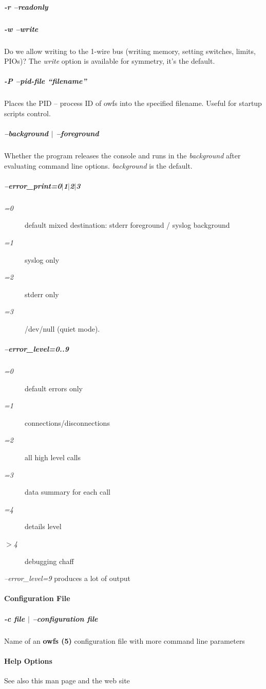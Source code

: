 \subparagraph*{-r --readonly}
\subparagraph*{-w --write}Do we allow writing to the 1-wire bus (writing memory,
setting switches, limits, PIOs)? The \textit{write} option is available for symmetry,
it's the default. 
\subparagraph*{-P --pid-file ``filename''}Places the PID -- process ID of owfs
into the specified filename. Useful for startup scripts control. 
\subparagraph*{--background
$|$ --foreground}Whether the program releases the console and runs in the \textit{background}
after evaluating command line options. \textit{background} is the default. 
\subparagraph*{--error\_print=0$|$1$|$2$|$3}\begin{description}
\item [\textit{=0}
] default mixed destination: stderr foreground / syslog background 
\item [\textit{=1} ] syslog
only 
\item [\textit{=2} ] stderr only 
\item [\textit{=3} ] /dev/null (quiet mode). 
\end{description}

\subparagraph*{--error\_level=0..9}\begin{description}
\item [\textit{=0} ] default
errors only 
\item [\textit{=1} ] connections/disconnections 
\item [\textit{=2} ] all high level calls 
\item [\textit{=3} ] data
summary for each call 
\item [\textit{=4} ] details level 
\item [\textit{$>$4} ] debugging chaff 
\end{description}


\textit{--error\_level=9}
produces a lot of output            
\paragraph*{Configuration File}

\subparagraph*{-c file $|$ --configuration
file}Name of an \textsf{\textbf{owfs (5)}} configuration file with more command line parameters
            
\paragraph*{Help Options}
See also this man page and the web site 


